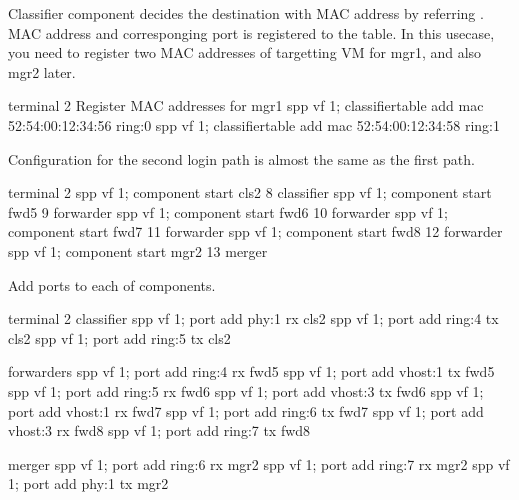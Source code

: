 \documentclass[a4paper,11pt,openany,oneside,english]{sphinxmanual}
\begin{document}
Classifier component decides the destination with MAC address by referring
. MAC address and corresponging port is registered to the
table. In this usecase, you need to register two MAC addresses of targetting
VM for mgr1, and also mgr2 later.

\begin{sphinxVerbatim}[commandchars=\\\{\},formatcom=\footnotesize]
\PYGZsh{} terminal 2
\PYGZsh{} Register MAC addresses for mgr1
spp \PYGZgt{} vf 1; classifier\PYGZus{}table add mac 52:54:00:12:34:56 ring:0
spp \PYGZgt{} vf 1; classifier\PYGZus{}table add mac 52:54:00:12:34:58 ring:1
\end{sphinxVerbatim}

Configuration for the second login path is almost the same as the first path.

\begin{sphinxVerbatim}[commandchars=\\\{\},formatcom=\footnotesize]
\PYGZsh{} terminal 2
spp \PYGZgt{} vf 1; component start cls2 8 classifier
spp \PYGZgt{} vf 1; component start fwd5 9 forwarder
spp \PYGZgt{} vf 1; component start fwd6 10 forwarder
spp \PYGZgt{} vf 1; component start fwd7 11 forwarder
spp \PYGZgt{} vf 1; component start fwd8 12 forwarder
spp \PYGZgt{} vf 1; component start mgr2 13 merger
\end{sphinxVerbatim}

Add ports to each of components.

\begin{sphinxVerbatim}[commandchars=\\\{\},formatcom=\footnotesize]
\PYGZsh{} terminal 2
\PYGZsh{} classifier
spp \PYGZgt{} vf 1; port add phy:1 rx cls2
spp \PYGZgt{} vf 1; port add ring:4 tx cls2
spp \PYGZgt{} vf 1; port add ring:5 tx cls2

\PYGZsh{} forwarders
spp \PYGZgt{} vf 1; port add ring:4 rx fwd5
spp \PYGZgt{} vf 1; port add vhost:1 tx fwd5
spp \PYGZgt{} vf 1; port add ring:5 rx fwd6
spp \PYGZgt{} vf 1; port add vhost:3 tx fwd6
spp \PYGZgt{} vf 1; port add vhost:1 rx fwd7
spp \PYGZgt{} vf 1; port add ring:6 tx fwd7
spp \PYGZgt{} vf 1; port add vhost:3 rx fwd8
spp \PYGZgt{} vf 1; port add ring:7 tx fwd8

\PYGZsh{} merger
spp \PYGZgt{} vf 1; port add ring:6 rx mgr2
spp \PYGZgt{} vf 1; port add ring:7 rx mgr2
spp \PYGZgt{} vf 1; port add phy:1 tx mgr2
\end{sphinxVerbatim}
\end{document}
